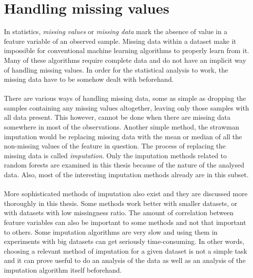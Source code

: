 \documentclass[11pt]{article}
\begin{document}
  \section{Handling missing values}
    In statistics, {\it missing values} or {\it missing data} mark the absence of value in a feature variable of an observed sample. Missing data within a dataset make it impossible for conventional machine learning algorithms to properly learn from it. Many of these algorithms require complete data and do not have an implicit way of handling missing values. In order for the statistical analysis to work, the missing data have to be somehow dealt with beforehand. \cite{otfi}
    \\~\\
    There are various ways of handling missing data, some as simple as dropping the samples containing any missing values altogether, leaving only those samples with all data present. \cite{lwd} This however, cannot be done when there are missing data somewhere in most of the observations. Another simple method, the strawman imputation \cite{otfi} would be replacing missing data with the mean or median of all the non-missing values of the feature in question. The process of replacing the missing data is called {\it imputation}. Only the imputation methods related to random forests are examined in this thesis because of the nature of the analysed data. Also, most of the interesting imputation methods already are in this subset.
    \\~\\
    More sophisticated methods of imputation also exist and they are discussed more thoroughly in this thesis. Some methods work better with smaller datasets, or with datasets with low missingness ratio. The amount of correlation between feature variables can also be important to some methods and not that important to others. \cite{otfi} Some imputation algorithms are very slow and using them in experiments with big datasets can get seriously time-consuming. In other words, choosing a relevant method of imputation for a given dataset is not a simple task and it can prove useful to do an analysis of the data as well as an analysis of the imputation algorithm itself beforehand.
\end{document}
